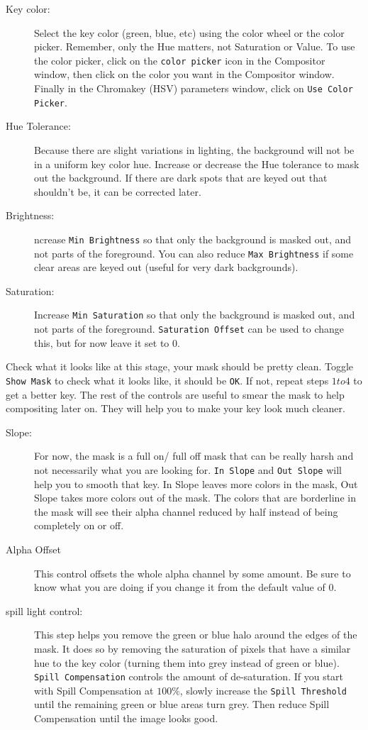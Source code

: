 \begin{description}
    \item[Key color:] Select the key color (green, blue, etc) using the color wheel or the color picker. Remember, only the Hue matters, not Saturation or Value. To use the color picker, click on the \texttt{color picker} icon in the Compositor window, then click on the color you want in the Compositor window. Finally  in the Chromakey (HSV) parameters window, click on \texttt{Use Color Picker}.
    \item[Hue Tolerance:] Because there are slight variations in lighting, the background will not be in a uniform key color hue. Increase or decrease the Hue tolerance to mask out the background. If there are dark spots that are keyed out that shouldn’t be, it can be corrected later.
    \item[Brightness:] ncrease \texttt{Min Brightness} so that only the background is masked out, and not parts of the foreground. You can also reduce \texttt{Max Brightness} if some clear areas are keyed out (useful for very dark backgrounds).
    \item[Saturation:] Increase \texttt{Min Saturation} so that only the background is masked out, and not parts of the foreground. \texttt{Saturation Offset} can be used to change this, but for now leave it set to $0$.
\end{description}

Check what it looks like at this stage, your mask should be pretty clean. Toggle \texttt{Show Mask} to check what it looks like, it should be \texttt{OK}. If not, repeat steps $1 to 4$ to get a better key. The rest of the controls are useful to smear the mask to help compositing later on. They will help you to make your key look much cleaner.

\begin{description}
    \item[Slope:] For now, the mask is a full on/ full off mask that can be really harsh and not necessarily what you are looking for. \texttt{In Slope} and \texttt{Out Slope} will help you to smooth that key. In Slope leaves more colors in the mask, Out Slope takes more colors out of the mask. The colors that are borderline in the mask will see their alpha channel reduced by half instead of being completely on or off.
    \item[Alpha Offset] This control offsets the whole alpha channel by some amount. Be sure to know what you are doing if you change it from the default value of $0$.
    \item[spill light control:] This step helps you remove the green or blue halo around the edges of the mask. It does so by removing the saturation of pixels that have a similar hue to the key color (turning them into grey instead of green or blue). \texttt{Spill Compensation} controls the amount of de-saturation. If you start with Spill Compensation at $100\%$, slowly increase the \texttt{Spill Threshold} until the remaining green or blue areas turn grey. Then reduce Spill Compensation until the image looks good.
\end{description}

